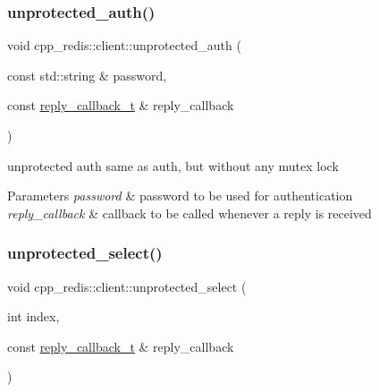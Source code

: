 \mbox{\label{classcpp__redis_1_1client_a0bb20d17620ff63219f7e932d3baa0c6}} 
\subsubsection{\texorpdfstring{unprotected\+\_\+auth()}{unprotected\_auth()}}
{\footnotesize\ttfamily void cpp\+\_\+redis\+::client\+::unprotected\+\_\+auth (\begin{DoxyParamCaption}\item[{const std\+::string \&}]{password,  }\item[{const \hyperlink{classcpp__redis_1_1client_a061a1140d36d2eaeda82b09a0bb3f9f2}{reply\+\_\+callback\+\_\+t} \&}]{reply\+\_\+callback }\end{DoxyParamCaption})\hspace{0.3cm}{\ttfamily [private]}}

unprotected auth same as auth, but without any mutex lock


\begin{DoxyParams}{Parameters}
{\em password} & password to be used for authentication \\
\hline
{\em reply\+\_\+callback} & callback to be called whenever a reply is received \\
\hline
\end{DoxyParams}
\mbox{\label{classcpp__redis_1_1client_ae2ac4b582d4d656b3c76450ea88c7b58}} 
\subsubsection{\texorpdfstring{unprotected\+\_\+select()}{unprotected\_select()}}
{\footnotesize\ttfamily void cpp\+\_\+redis\+::client\+::unprotected\+\_\+select (\begin{DoxyParamCaption}\item[{int}]{index,  }\item[{const \hyperlink{classcpp__redis_1_1client_a061a1140d36d2eaeda82b09a0bb3f9f2}{reply\+\_\+callback\+\_\+t} \&}]{reply\+\_\+callback }\end{DoxyParamCaption})\hspace{0.3cm}{\ttfamily [private]}}

